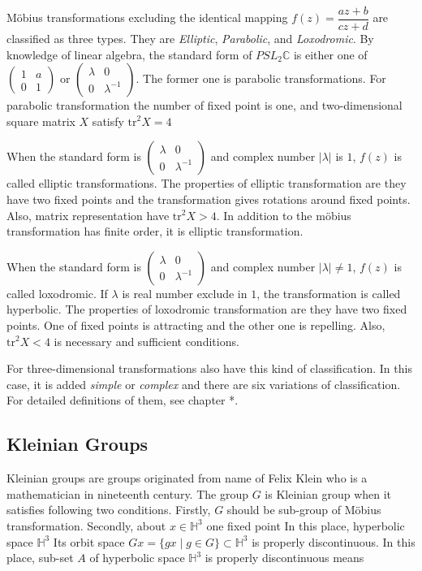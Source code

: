 M\"obius transformations excluding the identical mapping
$f(z) = \dfrac{az + b}{cz + d}$ are classified as three types.
They are \textit{Elliptic}, \textit{Parabolic}, and \textit{Loxodromic}.
By knowledge of linear algebra, the standard form of $PSL_2\mathbb{C}$
is either one of $\begin{pmatrix}1 & a \\ 0 & 1 \end{pmatrix}$ or
$\begin{pmatrix}\lambda & 0 \\ 0 & \lambda^{-1} \end{pmatrix}$.
The former one is parabolic transformations.
For parabolic transformation the number of fixed point is one, and
two-dimensional square matrix $X$ satisfy $\mathrm{tr}^2X = 4$

When the standard form is
$\begin{pmatrix}\lambda & 0 \\ 0 & \lambda^{-1} \end{pmatrix}$
and complex number $|\lambda|$ is $1$, $f(z)$ is called elliptic
transformations. The properties of elliptic transformation are they have
two fixed points and the transformation gives rotations around fixed
points.
Also, matrix representation have $\mathrm{tr}^2X > 4$.
In addition to the m\"obius transformation has finite order,
it is elliptic transformation.

When the standard form is
$\begin{pmatrix}\lambda & 0 \\ 0 & \lambda^{-1} \end{pmatrix}$
and complex number $|\lambda| \neq 1$, $f(z)$ is called loxodromic.
If $\lambda$ is real number exclude in $1$, the transformation is called
hyperbolic.
The properties of loxodromic transformation are they have two fixed
points. One of fixed points is attracting and the other one is repelling.
Also, $\mathrm{tr}^2X < 4$ is necessary and sufficient conditions.

For three-dimensional transformations also have this kind of
classification.
In this case, it is added \textit{simple} or \textit{complex} and
there are six variations of classification.
For detailed definitions of them, see chapter *.

\subsection{Kleinian Groups}

Kleinian groups are groups originated from name of Felix Klein who is
a mathematician in nineteenth century.
The group $G$ is Kleinian group when it satisfies following two
conditions. 
Firstly, $G$ should be sub-group of M\"obius transformation.
Secondly, about $x\in\mathbb{H}^3$ one fixed point 
In this place, hyperbolic space $\mathbb{H}^3$
Its orbit space $Gx = \{ gx \mid g\in G\}\subset \mathbb{H}^3$
is properly discontinuous.
In this place, sub-set $A$ of hyperbolic space $\mathbb{H}^3$
is properly discontinuous means 


